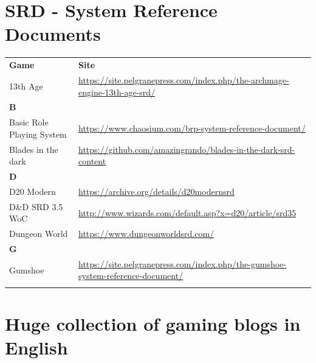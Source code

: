 \documentclass[a4paper, 11pt, twoside]{article}
\begin{document}
\section{SRD - System Reference Documents}
\label{sec:org557f686}

\begin{longtable}{lp{10cm}}
\textbf{Game} & \textbf{Site}\\
13th Age & \url{https://site.pelgranepress.com/index.php/the-archmage-engine-13th-age-srd/}\\
\textbf{B} & \\
Basic Role Playing System & \url{https://www.chaosium.com/brp-system-reference-document/}\\
Blades in the dark & \url{https://github.com/amazingrando/blades-in-the-dark-srd-content}\\
\textbf{D} & \\
D20 Modern & \url{https://archive.org/details/d20modernsrd}\\
D\&D SRD 3.5 WoC & \url{http://www.wizards.com/default.asp?x=d20/article/srd35}\\
Dungeon World & \url{https://www.dungeonworldsrd.com/}\\
\textbf{G} & \\
Gumshoe & \url{https://site.pelgranepress.com/index.php/the-gumshoe-system-reference-document/}\\
 & \\
\end{longtable}

\section{Huge collection of gaming blogs in English}
\label{sec:org2e4d937}
\end{document}
